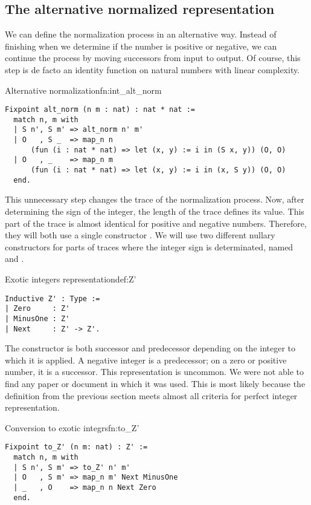 \subsection{The alternative normalized representation}
We can define the normalization process in an alternative way. Instead of finishing when we determine if the number is positive or negative, we can continue the process by moving successors from input to output. Of course, this step is de facto an identity function on natural numbers with linear complexity.
\begin{func}{Alternative normalization}{fn:int_alt_norm}
\begin{verbatim}
Fixpoint alt_norm (n m : nat) : nat * nat :=
  match n, m with
  | S n', S m' => alt_norm n' m'
  | O   , S _  => map_n n 
      (fun (i : nat * nat) => let (x, y) := i in (S x, y)) (O, O)
  | O   , _    => map_n m 
      (fun (i : nat * nat) => let (x, y) := i in (x, S y)) (O, O)
  end.
\end{verbatim}
\end{func}
This unnecessary step changes the trace of the normalization process. Now, after determining the sign of the integer, the length of the trace defines its value. This part of the trace is almost identical for positive and negative numbers. Therefore, they will both use a single constructor . We will use two different nullary constructors for parts of traces where the integer sign is determinated, named  and .
\begin{defi}{Exotic integers representation}{def:Z'}
\begin{verbatim}
Inductive Z' : Type :=
| Zero     : Z'
| MinusOne : Z'
| Next     : Z' -> Z'.
\end{verbatim}
\end{defi}
The  constructor is both successor and predecessor depending on the integer to which it is applied. A negative integer is a predecessor; on a zero or positive number, it is a successor. This representation is uncommon. We were not able to find any paper or document in which it was used. This is most likely because the definition from the previous section meets almost all criteria for perfect integer representation.
\begin{func}{Conversion to exotic integrs}{fn:to_Z'}
\begin{verbatim}
Fixpoint to_Z' (n m: nat) : Z' :=
  match n, m with
  | S n', S m' => to_Z' n' m'
  | O   , S m' => map_n m' Next MinusOne
  | _   , O    => map_n n Next Zero
  end.
\end{verbatim}
\end{func}
